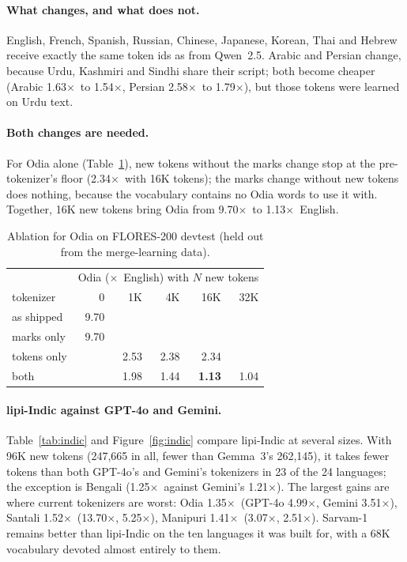 \documentclass[11pt]{article}
\newcommand{\x}{$\times$}
\begin{document}
\paragraph{What changes, and what does not.} English, French, Spanish, Russian, Chinese, Japanese,
Korean, Thai and Hebrew receive exactly the same token ids as from Qwen~2.5. Arabic and Persian
change, because Urdu, Kashmiri and Sindhi share their script; both become cheaper (Arabic 1.63\x\ to
1.54\x, Persian 2.58\x\ to 1.79\x), but those tokens were learned on Urdu text.

\paragraph{Both changes are needed.} For Odia alone (Table~\ref{tab:ablation}), new tokens without
the marks change stop at the pre-tokenizer's floor (2.34\x\ with 16K tokens); the marks change without
new tokens does nothing, because the vocabulary contains no Odia words to use it with. Together, 16K
new tokens bring Odia from 9.70\x\ to 1.13\x\ English.

\begin{table}[t]
\centering
\small
\begin{tabular}{lrrrrr}
\toprule
& \multicolumn{5}{c}{Odia (\x\ English) with $N$ new tokens} \\
tokenizer & 0 & 1K & 4K & 16K & 32K \\
\midrule
as shipped & 9.70 & & & & \\
marks only & 9.70 & & & & \\
tokens only & & 2.53 & 2.38 & 2.34 & \\
both & & 1.98 & 1.44 & \textbf{1.13} & 1.04 \\
\bottomrule
\end{tabular}
\caption{Ablation for Odia on FLORES-200 devtest (held out from the merge-learning data).}
\label{tab:ablation}
\end{table}

\paragraph{lipi-Indic against GPT-4o and Gemini.} Table~\ref{tab:indic} and Figure~\ref{fig:indic}
compare lipi-Indic at several sizes. With 96K new tokens (247,665 in all, fewer than Gemma~3's
262,145), it takes fewer tokens than both GPT-4o's and Gemini's tokenizers in 23 of the 24 languages;
the exception is Bengali (1.25\x\ against Gemini's 1.21\x). The largest gains are where current
tokenizers are worst: Odia 1.35\x\ (GPT-4o 4.99\x, Gemini 3.51\x), Santali 1.52\x\ (13.70\x,
5.25\x), Manipuri 1.41\x\ (3.07\x, 2.51\x). Sarvam-1 remains better than lipi-Indic on the ten
languages it was built for, with a 68K vocabulary devoted almost entirely to them.
\end{document}
